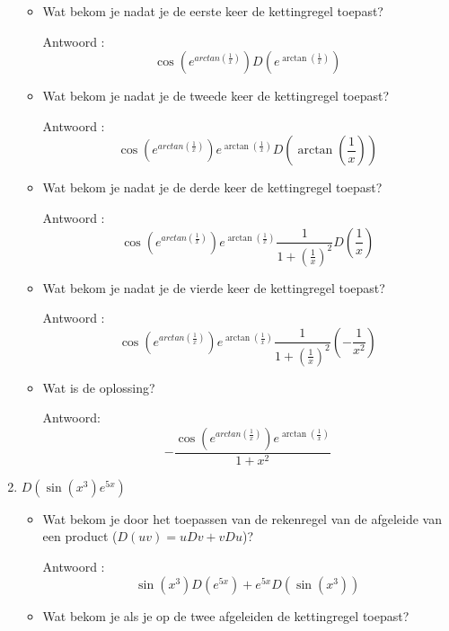 \begin{enumerate}
	\begin{itemize}
		
		\item Wat bekom je nadat je de eerste keer de kettingregel toepast?
		
		Antwoord : \[\cos \left(  e^{arctan \left(  \frac{1}{x}  \right) } \right) D \left(  e^{\arctan \left(  \frac{1}{x}  \right) }  \right)\]
		
		\item Wat bekom je nadat je de tweede keer de kettingregel toepast?
		
		Antwoord : \[\cos \left(  e^{arctan \left(  \frac{1}{x}  \right) } \right) e^{\arctan \left(  \frac{1}{x}  \right) }D \left( \arctan \left(  \frac{1}{x}  \right)  \right)\]
		
		\item Wat bekom je nadat je de derde keer de kettingregel toepast?
		
		Antwoord : \[\cos \left(  e^{arctan \left(  \frac{1}{x}  \right) } \right) e^{\arctan \left(  \frac{1}{x}  \right) }\frac{1}{1+\left( \frac{1}{x}  \right)^2}D\left( \frac{1}{x}  \right)\]
		
		\item Wat bekom je nadat je de vierde keer de kettingregel toepast?
		
		Antwoord :  \[\cos \left(  e^{arctan \left(  \frac{1}{x}  \right) } \right) e^{\arctan \left(  \frac{1}{x}  \right) }\frac{1}{1+\left( \frac{1}{x}  \right)^2}\left( -\frac{1}{x^2}  \right)\]
		
		\item Wat is de oplossing?
		
		Antwoord: \[-\frac{ \cos \left(  e^{arctan \left(  \frac{1}{x}  \right) } \right)  e^{\arctan \left(  \frac{1}{x}  \right) }  }{ 1+x^2  }\]
		
	\end{itemize}
	
	\item $D \left(  \sin \left( x^3  \right) e^{5x}  \right)$
	
	\begin{itemize}
		
		\item Wat bekom je door het toepassen van de rekenregel van de afgeleide van een product ($D(uv)=uDv+vDu$)?
		
		Antwoord : \[\sin \left( x^3  \right)D\left( e^{5x}  \right)+e^{5x}D\left(  \sin \left(  x^3 \right)  \right)\]
		
		\item Wat bekom je als je op de twee afgeleiden de kettingregel toepast?
		

\end{itemize}
\end{enumerate}
